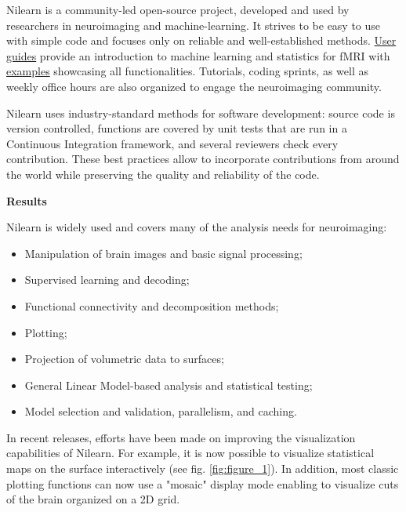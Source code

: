 \documentclass[a4paper]{article}
\begin{document}
\medskip

\noindent Nilearn is a community-led open-source project, developed and used by researchers in neuroimaging and machine-learning. It strives to be easy to use with simple code and focuses only on reliable and well-established methods. \href{https://nilearn.github.io/stable/user_guide.html}{User guides} provide an introduction to machine learning and statistics for fMRI with \href{https://nilearn.github.io/stable/auto_examples/index.html}{examples} showcasing all functionalities. Tutorials, coding sprints, as well as weekly office hours are also organized to engage the neuroimaging community.

\medskip

\noindent Nilearn uses industry-standard methods for software development: source code is version controlled, functions are covered by unit tests that are run in a Continuous Integration framework, and several reviewers check every contribution. These best practices allow to incorporate contributions from around the world while preserving the quality and reliability of the code.

\bigskip

\noindent \textbf{Results}

\medskip

\noindent Nilearn is widely used and covers many of the analysis needs for neuroimaging:

\begin{itemize}
	\item Manipulation of brain images and basic signal processing;
	\item Supervised learning and decoding;
	\item Functional connectivity and decomposition methods;
	\item Plotting;
	\item Projection of volumetric data to surfaces;
	\item General Linear Model-based analysis and statistical testing;
	\item Model selection and validation, parallelism, and caching.
\end{itemize}

\noindent In recent releases, efforts have been made on improving the visualization capabilities of Nilearn. For example, it is now possible to visualize statistical maps on the surface interactively (see fig. \ref{fig:figure_1}). In addition, most classic plotting functions can now use a "mosaic" display mode enabling to visualize cuts of the brain organized on a 2D grid.
\end{document}
